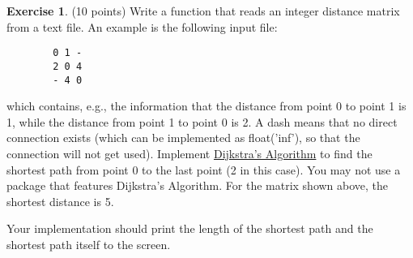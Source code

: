 \documentclass[a4paper]{report}
\theoremstyle{definition}
\newtheorem{exercise}{Exercise}
\begin{document}
	\begin{exercise}
		(10 points) Write a function that reads an integer distance matrix from a text file. An example is the following input file:
		
		\begin{verbatim}
		0 1 -
		2 0 4
		- 4 0
		\end{verbatim}
		
		\noindent which contains, e.g., the information that the distance from point 0 to point 1 is 1, while the distance from point 1 to point 0 is 2. A dash means that no direct connection exists (which can be implemented as float('inf'), so that the connection will not get used). Implement \href{https://en.wikipedia.org/wiki/Dijkstra's_algorithm\#Pseudocode}{Dijkstra's Algorithm} to find the shortest path from point 0 to the last point (2 in this case). You may not use a package that features Dijkstra’s Algorithm. For the matrix shown above, the shortest distance is 5.
		
		Your implementation should print the length of the shortest path and the shortest path itself to the screen.
	\end{exercise}
	
\end{document}
